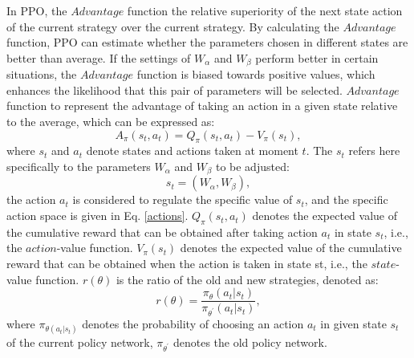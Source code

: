 \documentclass[review]{elsarticle}
\begin{document}
In PPO, the $Advantage$ function the relative superiority of the next state action of the current strategy over the current strategy. By calculating the $Advantage$ function, PPO can estimate whether the parameters chosen in different states are better than average. If the settings of $W_{\alpha}$ and $W_{\beta}$ perform better in certain situations, the $Advantage$ function is biased towards positive values, which enhances the likelihood that this pair of parameters will be selected. $Advantage$ function to represent the advantage of taking an action in a given state relative to the average, which can be expressed as:
\begin{equation}
	\label{adv}
	A_{\pi}(s_{t},a_{t})=Q_{\pi}(s_{t},a_{t})-V_{\pi}(s_{t}),
\end{equation}
where $s_{t}$ and $a_{t}$ denote states and actions taken at moment $t$. The $s_{t}$ refers here specifically to the parameters $W_{\alpha}$ and $W_{\beta}$ to be adjusted:
\begin{equation}
		\label{st}
		s_{t}=(W_{\alpha}, W_{\beta}),
\end{equation}
the action $a_{t}$ is considered to regulate the specific value of $s_{t}$, and the specific action space is given in Eq. \eqref{actions}.
$Q_{\pi}(s_{t},a_{t})$ denotes the expected value of the cumulative reward that can be obtained after taking action $a_{t}$ in state $s_{t}$, i.e., the $action$-value function. $V_{\pi}(s_{t})$ denotes the expected value of the cumulative reward that can be obtained when the action is taken in state st, i.e., the $state$-value function.
$r(\theta)$ is the ratio of the old and new strategies, denoted as:
\begin{equation}
	\label{oldtheta}
	r(\theta) = \frac{\pi_{\theta}(a_{t}|s_{t})}{\pi_{\theta^{\prime}}(a_{t}|s_{t})},
\end{equation}
where $\pi_{\theta(a_{t}|s_{t})}$ denotes the probability of choosing an action $a_{t}$ in given state $s_{t}$ of the current policy network, $\pi_{\theta^{\prime}}$ denotes the old policy network.
\end{document}
